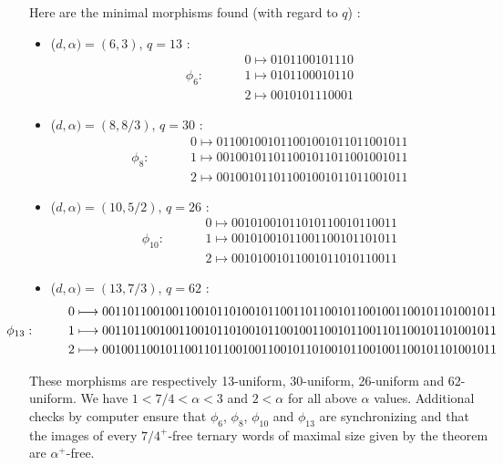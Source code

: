 \documentclass[a4paper]{article}
\theoremstyle{definition}
\begin{document}
Here are the minimal morphisms found (with regard to $q$) :

\begin{itemize}
    \item ($d,\alpha) = (6,3)$, $q = 13$ :
\begin{align*}
  & 0 \longmapsto 0101100101110\\
\phi_6 : \hspace{1cm} & 1 \longmapsto 0101100010110 \\
  & 2 \longmapsto 0010101110001
\end{align*}
    \item ($d,\alpha) = (8,8/3)$, $q = 30$ :
    \begin{align*}
  & 0 \longmapsto 011001001011001001011011001011\\
\phi_8 : \hspace{1cm} & 1 \longmapsto 001001011011001011011001001011 \\
  & 2 \longmapsto 001001011011001001011011001011
\end{align*}
    \item ($d,\alpha) = (10,5/2)$, $q = 26$ :
    \begin{align*}
  & 0 \longmapsto 00101001011010110010110011\\
\phi_{10} : \hspace{1cm} & 1 \longmapsto 00101001011001100101101011 \\
  & 2 \longmapsto 00101001011001011010110011
\end{align*}
\item ($d,\alpha) = (13,7/3)$, $q = 62$ :
    \begin{align*}
  & 0 \longmapsto 00110110010011001011010010110011011001011001001100101101001011\\
\hspace{-1.25cm} \phi_{13} : \hspace{1cm} & 1 \longmapsto 00110110010011001011010010110010011001011001101100101101001011 \\
  & 2 \longmapsto 00100110010110011011001001100101101001011001001100101101001011
\end{align*}
\end{itemize}

These morphisms are respectively 13-uniform, 30-uniform, 26-uniform and 62-uniform. We have $1 < 7/4 < \alpha < 3$ and $2 < \alpha$ for all above $\alpha$ values. Additional checks by computer ensure that $\phi_6$, $\phi_8$, $\phi_{10}$ and $\phi_{13}$ are synchronizing and that the images of every $7/4^+$-free ternary words of maximal size given by the theorem are $\alpha^+$-free.
\end{document}
